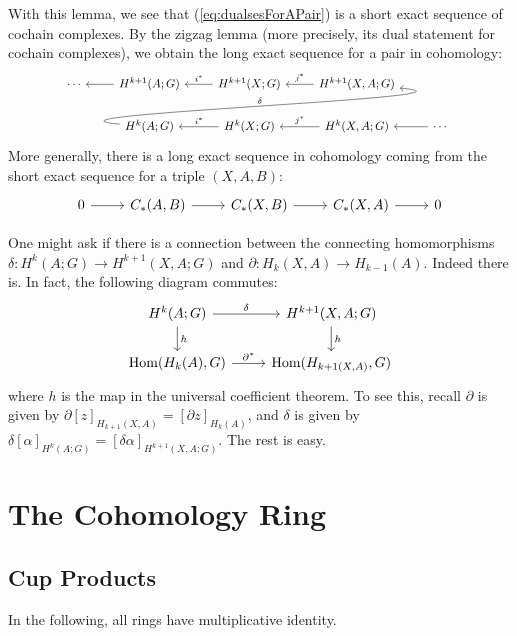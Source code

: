 \documentclass{book}
\DeclareMathOperator{\Hom}{Hom}
\theoremstyle{definition}
\theoremstyle{remark}
\numberwithin{equation}{section}
\begin{document}
With this lemma, we see that (\ref{eq:dualsesForAPair}) is a short exact sequence of cochain complexes. By the zigzag lemma (more precisely, its dual statement for cochain complexes), we obtain the long exact sequence for a pair in cohomology:
\begin{equation} \begin{tikzcd}
    \cdots & H^{k+1}(A;G) \arrow[l]                                 & H^{k+1}(X;G) \arrow[l,"i^*" above] & H^{k+1}(X,A;G) \arrow[l,"j^*" above] &                  \\
           & H^k(A;G)     \arrow[urr,out=175,in=355,"\delta" above] & H^k(X;G)     \arrow[l,"i^*" above] & H^k(X,A;G)     \arrow[l,"j^*" above] & \cdots \arrow[l] 
\end{tikzcd} \end{equation}
More generally, there is a long exact sequence in cohomology coming from the short exact sequence for a triple $(X,A,B)$:
\begin{equation} \begin{tikzcd}
    0 \arrow[r] & C_*(A,B) \arrow[r] & C_*(X,B) \arrow[r] & C_*(X,A) \arrow[r] & 0
\end{tikzcd} \end{equation}

One might ask if there is a connection between the connecting homomorphisms $\delta \colon H^k(A;G) \to H^{k+1}(X,A;G)$ and $\partial \colon H_k(X,A) \to H_{k-1}(A)$. Indeed there is. In fact, the following diagram commutes:
\begin{equation} \begin{tikzcd}
    H^k(A;G)       \arrow[r,"\delta"] \arrow[d,"h"] & H^{k+1}(X,A;G) \arrow[d,"h"] \\
    \Hom(H_k(A),G) \arrow[r,"\partial^*"]           & \Hom(H_{k+1(X,A)},G)
\end{tikzcd} \end{equation}
where $h$ is the map in the universal coefficient theorem. To see this, recall $\partial$ is given by $\partial[z]_{H_{k+1}(X,A)} = [\partial z]_{H_k(A)}$, and $\delta$ is given by $\delta[\alpha]_{H^k(A;G)} = [\delta\alpha]_{H^{k+1}(X,A;G)}$. The rest is easy.




\chapter{The Cohomology Ring}
\section{Cup Products}
In the following, all rings have multiplicative identity.
\end{document}

